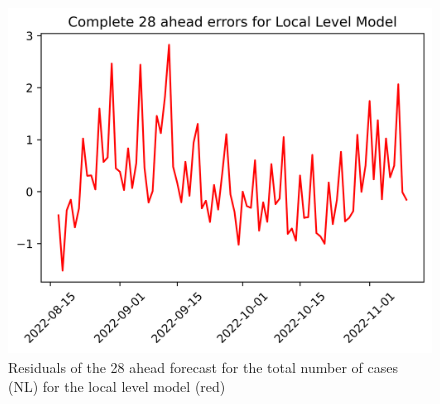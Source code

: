 \begin{figure}
\begin{minipage}{.32\textwidth}
  \label{fig:tot_cases_error_7_mix_DE}
\end{minipage}
\begin{minipage}{.32\textwidth}
  \centering
  \includegraphics[width=\linewidth]{pics/28_ah/28_ahead_errors_Local Level Model.png}
  \caption{Residuals of the 28 ahead forecast for the total number of cases (NL) for the local level model (red)}
  \label{fig:tot_cases_error_28_LLM}
\end{minipage}

\end{figure}

